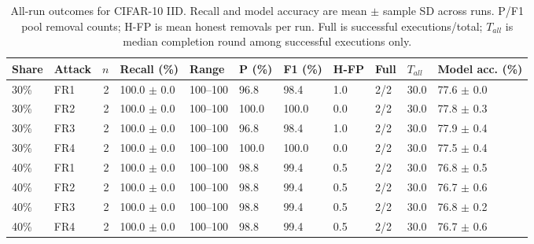 \documentclass[conference]{IEEEtran}
\begin{document}
\begin{table}[t]\centering\scriptsize
\setlength{\tabcolsep}{3.5pt}
\caption{All-run outcomes for CIFAR-10 IID. Recall and model accuracy are mean $\pm$ sample SD across runs. P/F1 pool removal counts; H-FP is mean honest removals per run. Full is successful executions/total; $T_{all}$ is median completion round among successful executions only.}
\begin{tabular}{llrllllllll}\toprule
Share & Attack & $n$ & Recall (\%) & Range & P (\%) & F1 (\%) & H-FP & Full & $T_{all}$ & Model acc. (\%) \\\midrule
30\% & FR1 & 2 & 100.0 $\pm$ 0.0 & 100--100 & 96.8 & 98.4 & 1.0 & 2/2 & 30.0 & 77.6 $\pm$ 0.0 \\
30\% & FR2 & 2 & 100.0 $\pm$ 0.0 & 100--100 & 100.0 & 100.0 & 0.0 & 2/2 & 30.0 & 77.8 $\pm$ 0.3 \\
30\% & FR3 & 2 & 100.0 $\pm$ 0.0 & 100--100 & 96.8 & 98.4 & 1.0 & 2/2 & 30.0 & 77.9 $\pm$ 0.4 \\
30\% & FR4 & 2 & 100.0 $\pm$ 0.0 & 100--100 & 100.0 & 100.0 & 0.0 & 2/2 & 30.0 & 77.5 $\pm$ 0.4 \\
40\% & FR1 & 2 & 100.0 $\pm$ 0.0 & 100--100 & 98.8 & 99.4 & 0.5 & 2/2 & 30.0 & 76.8 $\pm$ 0.5 \\
40\% & FR2 & 2 & 100.0 $\pm$ 0.0 & 100--100 & 98.8 & 99.4 & 0.5 & 2/2 & 30.0 & 76.7 $\pm$ 0.6 \\
40\% & FR3 & 2 & 100.0 $\pm$ 0.0 & 100--100 & 98.8 & 99.4 & 0.5 & 2/2 & 30.0 & 76.8 $\pm$ 0.2 \\
40\% & FR4 & 2 & 100.0 $\pm$ 0.0 & 100--100 & 98.8 & 99.4 & 0.5 & 2/2 & 30.0 & 76.7 $\pm$ 0.6 \\
\bottomrule\end{tabular}\end{table}
\end{document}
